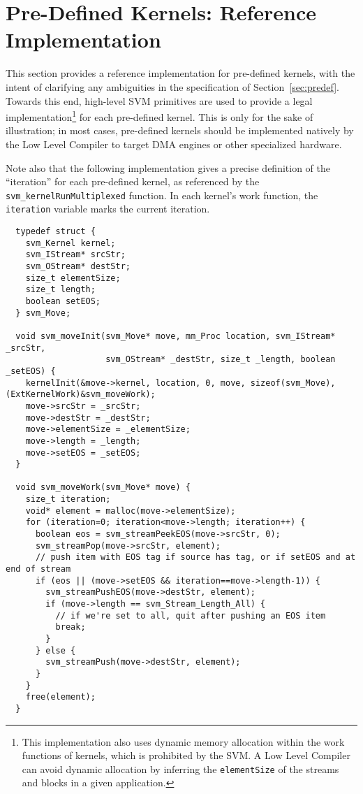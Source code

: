 \clearpage
\section{Pre-Defined Kernels:  Reference Implementation}  %
\label{sec:referenceimpl}

This section provides a reference implementation for pre-defined
kernels, with the intent of clarifying any ambiguities in the
specification of Section~\ref{sec:predef}.  Towards this end,
high-level SVM primitives are used to provide a legal
implementation\footnote{This implementation also uses dynamic memory
allocation within the work functions of kernels, which is prohibited
by the SVM.  A Low Level Compiler can avoid dynamic allocation by
inferring the {\tt elementSize} of the streams and blocks in a given
application.} for each pre-defined kernel.  This is only for the sake
of illustration; in most cases, pre-defined kernels should be
implemented natively by the Low Level Compiler to target DMA engines
or other specialized hardware.

Note also that the following implementation gives a precise definition
of the ``iteration'' for each pre-defined kernel, as referenced by the
{\tt svm\_kernelRunMultiplexed} function.  In each kernel's work
function, the {\tt iteration} variable marks the current iteration.

\makeline
{}
{\small
\begin{verbatim}
  typedef struct {
    svm_Kernel kernel;
    svm_IStream* srcStr;
    svm_OStream* destStr;
    size_t elementSize;
    size_t length;
    boolean setEOS;
  } svm_Move;

  void svm_moveInit(svm_Move* move, mm_Proc location, svm_IStream* _srcStr, 
                    svm_OStream* _destStr, size_t _length, boolean _setEOS) {
    kernelInit(&move->kernel, location, 0, move, sizeof(svm_Move), (ExtKernelWork)&svm_moveWork);
    move->srcStr = _srcStr;
    move->destStr = _destStr;
    move->elementSize = _elementSize;
    move->length = _length;
    move->setEOS = _setEOS;
  }

  void svm_moveWork(svm_Move* move) {
    size_t iteration;
    void* element = malloc(move->elementSize);
    for (iteration=0; iteration<move->length; iteration++) {
      boolean eos = svm_streamPeekEOS(move->srcStr, 0);
      svm_streamPop(move->srcStr, element);
      // push item with EOS tag if source has tag, or if setEOS and at end of stream
      if (eos || (move->setEOS && iteration==move->length-1)) {
        svm_streamPushEOS(move->destStr, element);
        if (move->length == svm_Stream_Length_All) {
          // if we're set to all, quit after pushing an EOS item
          break;
        }
      } else {
        svm_streamPush(move->destStr, element);
      }
    }
    free(element);
  }
\end{verbatim}}

